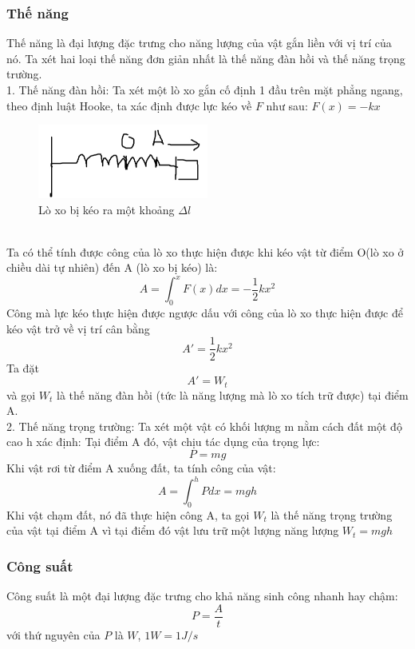 \subsubsection{Thế năng}
Thế năng là đại lượng đặc trưng cho năng lượng của vật gắn liền với vị trí của nó. Ta xét hai loại thế năng đơn giản nhất là thế năng đàn hồi và thế năng trọng trường.\\
1. Thế năng đàn hồi: Ta xét một lò xo gắn cố định 1 đầu trên mặt phẳng ngang, theo định luật Hooke, ta xác định được lực kéo về $F$ như sau: $F(x)=-kx$
\begin{figure}
    \centering
    \includegraphics[width=0.5\textwidth]{lo_xo.png}
    \caption{Lò xo bị kéo ra một khoảng $\Delta l$}
    \label{lo_xo}
\end{figure}
\\Ta có thể tính được công của lò xo thực hiện được khi kéo vật từ điểm O(lò xo ở chiều dài tự nhiên) đến A (lò xo bị kéo) là:
$$A=\int_{0}^{x}F(x)dx=-\frac{1}{2}kx^2$$
Công mà lực kéo thực hiện được ngược dấu với công của lò xo thực hiện được để kéo vật trở về vị trí cân bằng
$$A'=\frac{1}{2}kx^2$$
Ta đặt $$A'=W_{t}$$ và gọi $W_{t}$ là thế năng đàn hồi (tức là năng lượng mà lò xo tích trữ được) tại điểm A.
\\
2. Thế năng trọng trường: Ta xét một vật có khối lượng m nằm cách đất một độ cao h xác định:
Tại điểm A đó, vật chịu tác dụng của trọng lực:$$P=mg$$
Khi vật rơi từ điểm A xuống đất, ta tính công của vật:
$$A=\int_{0}^{h}Pdx=mgh$$
Khi vật chạm đất, nó đã thực hiện công A, ta gọi $W_{t}$ là thế năng trọng trường của vật tại điểm A vì tại điểm đó vật lưu trữ một lượng năng lượng $W_{t}=mgh$
\subsubsection{Công suất}
Công suất là một đại lượng đặc trưng cho khả năng sinh công nhanh hay chậm:
$$P=\frac{A}{t}$$ với thứ nguyên của $P$ là $W$, $1W=1J/s$
